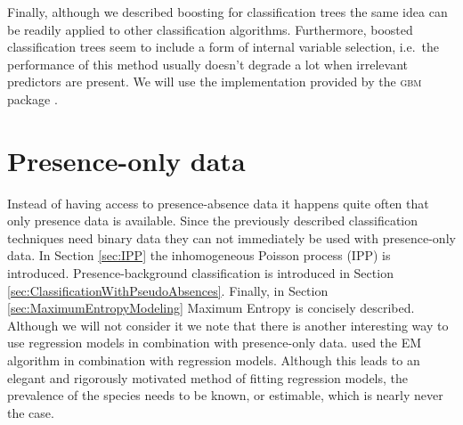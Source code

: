 Finally, although we described boosting for classification trees the same idea can be readily applied to other classification algorithms. Furthermore, boosted classification trees seem to include a form of internal variable selection, i.e.\ the performance of this method usually doesn't degrade a lot when irrelevant predictors are present. We will use the implementation provided by the \textsc{gbm} package \parencite{gbm}.

\section{Presence-only data}
\label{sec:PresenceOnlyData}
Instead of having access to presence-absence data it happens quite often that only presence data is available. Since the previously described classification techniques need binary data they can not immediately be used with presence-only data. In Section \ref{sec:IPP} the inhomogeneous Poisson process (IPP) is introduced. Presence-background classification is introduced in Section \ref{sec:ClassificationWithPseudoAbsences}. Finally, in Section \ref{sec:MaximumEntropyModeling} Maximum Entropy \parencite[MaxEnt;][]{phillips_maximum_2006,phillips_modeling_2008} is concisely described. \\ 

Although we will not consider it we note that there is another interesting way to use regression models in combination with presence-only data. \cite{ward_presence-only_2009} used the EM algorithm \parencite{dempster_maximum_1977} in combination with regression models. Although this leads to an elegant and rigorously motivated method of fitting regression models, the prevalence of the species needs to be known, or estimable, which is nearly never the case.

